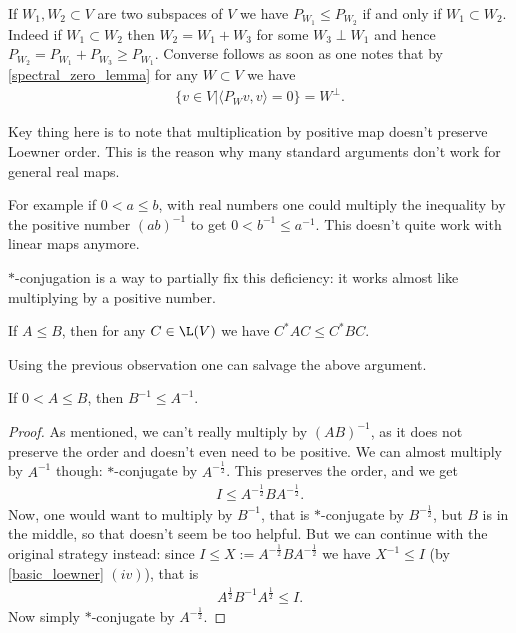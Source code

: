 \begin{esim}\label{projection_order}
	If $W_{1}, W_{2} \subset V$ are two subspaces of $V$ we have $P_{W_{1}} \leq P_{W_{2}}$ if and only if $W_{1} \subset W_{2}$. Indeed if $W_{1} \subset W_{2}$ then $W_{2} = W_{1} + W_{3}$ for some $W_{3} \perp W_{1}$ and hence $P_{W_{2}} = P_{W_{1}} + P_{W_{3}} \geq P_{W_{1}}$. Converse follows as soon as one notes that by \ref{spectral_zero_lemma} for any $W \subset V$ we have
	\begin{align*}
		\{v \in V | \langle P_{W} v, v\rangle = 0\} = W^{\perp}.
	\end{align*}
\end{esim}

Key thing here is to note that multiplication by positive map doesn't preserve Loewner order. This is the reason why many standard arguments don't work for general real maps.

For example if $0 < a \leq b$, with real numbers one could multiply the inequality by the positive number $(a b)^{-1}$ to get $0 < b^{-1} \leq a^{-1}$. This doesn't quite work with linear maps anymore.

$*$-conjugation is a way to partially fix this deficiency: it works almost like multiplying by a positive number.

\begin{prop}
	If $A \leq B$, then for any $C \in \L(V)$ we have $C^{*} A C \leq C^{*} B C$.
\end{prop}

Using the previous observation one can salvage the above argument.

\begin{lause}\label{inverse_decreasing}
	If $0 < A \leq B$, then $B^{-1} \leq A^{-1}$.
\end{lause}
\begin{proof}
	As mentioned, we can't really multiply by $(A B)^{-1}$, as it does not preserve the order and doesn't even need to be positive. We can almost multiply by $A^{-1}$ though: $*$-conjugate by $A^{-\frac{1}{2}}$. This preserves the order, and we get
	\begin{align*}
		I \leq A^{-\frac{1}{2}} B A^{-\frac{1}{2}}.
	\end{align*}
	Now, one would want to multiply by $B^{-1}$, that is $*$-conjugate by $B^{-\frac{1}{2}}$, but $B$ is in the middle, so that doesn't seem be too helpful. But we can continue with the original strategy instead: since $I \leq X := A^{-\frac{1}{2}} B A^{-\frac{1}{2}}$ we have $X^{-1} \leq I$ (by \ref{basic_loewner} $(iv)$), that is
	\begin{align*}
		A^{\frac{1}{2}} B^{-1} A^{\frac{1}{2}} \leq I.
	\end{align*}
	Now simply $*$-conjugate by $A^{-\frac{1}{2}}$.
\end{proof}

